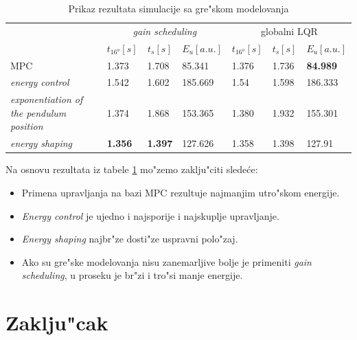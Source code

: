 \documentclass[a4paper,11pt]{article}
\theoremstyle{definition} \newtheorem{deff}{Definicija}[section]
\theoremstyle{definition} \newtheorem{prim}[deff]{Primer}
\theoremstyle{plain} \newtheorem{teor}[deff]{Teorema}
\begin{document}
	\begin{table}[!h]
		\begin{tabular}{lllllll}
			\cline{2-7}
			\multirow{2}{*}{} & \multicolumn{3}{c}{\emph{gain scheduling}} & \multicolumn{3}{c}{globalni LQR} \\ \cline{2-7} 
			& \multicolumn{1}{c}{$t_{16^o} [s]$} & \multicolumn{1}{c}{$t_s [s]$} & \multicolumn{1}{c}{$E_u [a.u.]$} & \multicolumn{1}{c}{$t_{16^o} [s]$} & \multicolumn{1}{c}{$t_s [s]$} & \multicolumn{1}{c}{$E_u [a.u.]$} \\ \hline
			MPC                
			& 1.373      & 1.708      & 85.341      & 1.376   & 1.736  & \textbf{84.989}
			\\ \hline
			\emph{energy control}
			&  1.542 & 1.602  & 185.669 & 1.54   & 1.598  & 186.333
			\\ \hline
			\emph{exponentiation of the pendulum position}
			& 1.374  & 1.868  & 153.365 & 1.380   & 1.932   & 155.301
			\\ \hline
			\emph{energy shaping}  
			& \textbf{1.356}  & \textbf{1.397}  &127.626 & 1.358   & 1.398  & 127.91
			\\ \hline
		\end{tabular}
		\caption{Prikaz rezultata simulacije sa gre"skom modelovanja }
		\label{tab:error}
	\end{table}
	
	Na osnovu rezultata iz tabele \ref{tab:error} mo"zemo zaklju"citi slede\'ce: 
	\begin{itemize}
		\item Primena upravljanja na bazi MPC rezultuje najmanjim utro"skom energije.
		\item \emph{Energy control} je ujedno i najsporije i najskuplje upravljanje.
		\item \emph{Energy shaping} najbr"ze dosti"ze uspravni polo"zaj.
		\item Ako su gre"ske modelovanja nisu zanemarljive bolje je primeniti \emph{gain scheduling}, u proseku je br"zi i tro"si manje energije.
	\end{itemize}
	
	
	\clearpage
	\section{Zaklju"cak}\label{sec:zakljucak}
	
	
	\newpage
	
\end{document}
